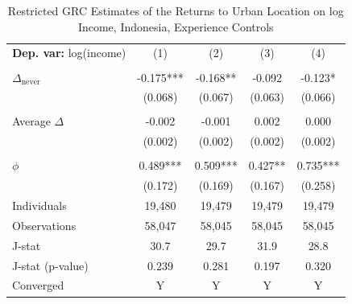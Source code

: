 \begin{table}[htbp] \centering \begin{threeparttable}
 \caption{Restricted GRC Estimates of the Returns to Urban Location on log Income, Indonesia, Experience Controls} 
 \label{tab:GRC_IDN_income_urban_unb_exp} 
\begin{tabular}{l cccc} \toprule  \textbf{Dep. var:}  log(income) 
                    &\multicolumn{1}{c}{(1)}   &\multicolumn{1}{c}{(2)}   &\multicolumn{1}{c}{(3)}   &\multicolumn{1}{c}{(4)}   \\
                    &               &               &               &               \\
\addlinespace
$\Delta_{\text{never}}$&      -0.175***&      -0.168** &      -0.092   &      -0.123*  \\
                    &     (0.068)   &     (0.067)   &     (0.063)   &     (0.066)   \\
                    &               &               &               &               \\
\addlinespace
Average $\Delta$    &      -0.002   &      -0.001   &       0.002   &       0.000   \\
                    &     (0.002)   &     (0.002)   &     (0.002)   &     (0.002)   \\
                    &               &               &               &               \\
\addlinespace
$\phi$              &       0.489***&       0.509***&       0.427** &       0.735***\\
                    &     (0.172)   &     (0.169)   &     (0.167)   &     (0.258)   \\
\addlinespace
Individuals         &      19,480   &      19,479   &      19,479   &      19,479   \\
Observations        &      58,047   &      58,045   &      58,045   &      58,045   \\
J-stat              &        30.7   &        29.7   &        31.9   &        28.8   \\
J-stat (p-value)    &       0.239   &       0.281   &       0.197   &       0.320   \\
Converged           &           Y   &           Y   &           Y   &           Y   \\

\end{tabular}
\end{threeparttable}
\end{table}
